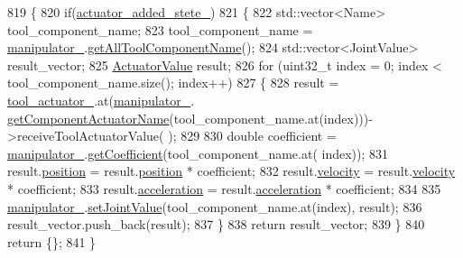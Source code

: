\begin{DoxyCode}
819 \{
820   \textcolor{keywordflow}{if}(\hyperlink{classrobotis__manipulator_1_1_robotis_manipulator_a02073b7982b992642b28acfa35a17769}{actuator\_added\_stete\_})
821   \{
822     std::vector<Name> tool\_component\_name;
823     tool\_component\_name = \hyperlink{classrobotis__manipulator_1_1_robotis_manipulator_a5b2df4a3b3ee7f408cb1d0eaf61644dc}{manipulator\_}.\hyperlink{classrobotis__manipulator_1_1_manipulator_a53cf6f3195057072869795ebac3b8dce}{getAllToolComponentName}();
824     std::vector<JointValue> result\_vector;
825     \hyperlink{structrobotis__manipulator_1_1_point}{ActuatorValue} result;
826     \textcolor{keywordflow}{for} (uint32\_t index = 0; index < tool\_component\_name.size(); index++)
827     \{
828       result = \hyperlink{classrobotis__manipulator_1_1_robotis_manipulator_a9d472875a989092466257d14dff2bdcf}{tool\_actuator\_}.at(\hyperlink{classrobotis__manipulator_1_1_robotis_manipulator_a5b2df4a3b3ee7f408cb1d0eaf61644dc}{manipulator\_}.
      \hyperlink{classrobotis__manipulator_1_1_manipulator_a371446cbf4d2d5a572b173d713305fb1}{getComponentActuatorName}(tool\_component\_name.at(index)))->receiveToolActuatorValue(
      );
829 
830       \textcolor{keywordtype}{double} coefficient = \hyperlink{classrobotis__manipulator_1_1_robotis_manipulator_a5b2df4a3b3ee7f408cb1d0eaf61644dc}{manipulator\_}.\hyperlink{classrobotis__manipulator_1_1_manipulator_a437ac5f137aa788c4db07690c185e9ba}{getCoefficient}(tool\_component\_name.at(
      index));
831       result.\hyperlink{structrobotis__manipulator_1_1_point_a0f122386b502d9b316bdead542ed2145}{position} = result.\hyperlink{structrobotis__manipulator_1_1_point_a0f122386b502d9b316bdead542ed2145}{position} * coefficient;
832       result.\hyperlink{structrobotis__manipulator_1_1_point_a4eaec95fac0c755eb0aa704b36ebe97b}{velocity} = result.\hyperlink{structrobotis__manipulator_1_1_point_a4eaec95fac0c755eb0aa704b36ebe97b}{velocity} * coefficient;
833       result.\hyperlink{structrobotis__manipulator_1_1_point_adb49f1fbcc0eaa7f530c54fdf0ede836}{acceleration} = result.\hyperlink{structrobotis__manipulator_1_1_point_adb49f1fbcc0eaa7f530c54fdf0ede836}{acceleration} * coefficient;
834 
835       \hyperlink{classrobotis__manipulator_1_1_robotis_manipulator_a5b2df4a3b3ee7f408cb1d0eaf61644dc}{manipulator\_}.\hyperlink{classrobotis__manipulator_1_1_manipulator_aa740b17551040520851ec8dc1d619bfe}{setJointValue}(tool\_component\_name.at(index), result);
836       result\_vector.push\_back(result);
837     \}
838     \textcolor{keywordflow}{return} result\_vector;
839   \}
840   \textcolor{keywordflow}{return} \{\};
841 \}
\end{DoxyCode}


